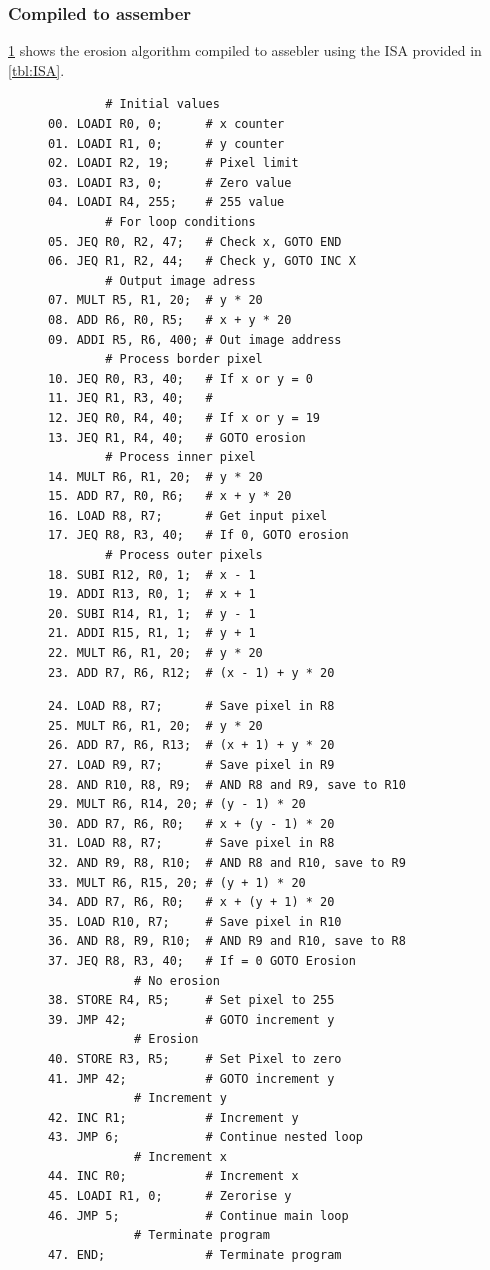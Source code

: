 \documentclass[a4paper, english]{article}
\numberwithin{equation}{section}
\begin{document}
\subsubsection{Compiled to assember}
\cref{lst:ass} shows the erosion algorithm compiled to assebler using the ISA provided in \cref{tbl:ISA}.
\begin{figure}
    \label{lst:ass}
    \begin{minipage}{0.49\textwidth}
        \vspace{1.5em}
        \centering
        \begin{verbatim}
        # Initial values
00. LOADI R0, 0;      # x counter
01. LOADI R1, 0;      # y counter
02. LOADI R2, 19;     # Pixel limit
03. LOADI R3, 0;      # Zero value
04. LOADI R4, 255;    # 255 value
        # For loop conditions
05. JEQ R0, R2, 47;   # Check x, GOTO END
06. JEQ R1, R2, 44;   # Check y, GOTO INC X
        # Output image adress
07. MULT R5, R1, 20;  # y * 20
08. ADD R6, R0, R5;   # x + y * 20
09. ADDI R5, R6, 400; # Out image address
        # Process border pixel
10. JEQ R0, R3, 40;   # If x or y = 0
11. JEQ R1, R3, 40;   #
12. JEQ R0, R4, 40;   # If x or y = 19
13. JEQ R1, R4, 40;   # GOTO erosion
        # Process inner pixel
14. MULT R6, R1, 20;  # y * 20
15. ADD R7, R0, R6;   # x + y * 20
16. LOAD R8, R7;      # Get input pixel
17. JEQ R8, R3, 40;   # If 0, GOTO erosion
        # Process outer pixels
18. SUBI R12, R0, 1;  # x - 1
19. ADDI R13, R0, 1;  # x + 1
20. SUBI R14, R1, 1;  # y - 1
21. ADDI R15, R1, 1;  # y + 1
22. MULT R6, R1, 20;  # y * 20
23. ADD R7, R6, R12;  # (x - 1) + y * 20
    \end{verbatim}
    \end{minipage}
    \begin{minipage}{0.49\textwidth}
        \vspace{.5em}
        \centering
        \begin{verbatim}
24. LOAD R8, R7;      # Save pixel in R8
25. MULT R6, R1, 20;  # y * 20
26. ADD R7, R6, R13;  # (x + 1) + y * 20
27. LOAD R9, R7;      # Save pixel in R9
28. AND R10, R8, R9;  # AND R8 and R9, save to R10
29. MULT R6, R14, 20; # (y - 1) * 20
30. ADD R7, R6, R0;   # x + (y - 1) * 20
31. LOAD R8, R7;      # Save pixel in R8
32. AND R9, R8, R10;  # AND R8 and R10, save to R9
33. MULT R6, R15, 20; # (y + 1) * 20
34. ADD R7, R6, R0;   # x + (y + 1) * 20
35. LOAD R10, R7;     # Save pixel in R10
36. AND R8, R9, R10;  # AND R9 and R10, save to R8
37. JEQ R8, R3, 40;   # If = 0 GOTO Erosion
            # No erosion
38. STORE R4, R5;     # Set pixel to 255
39. JMP 42;           # GOTO increment y
            # Erosion
40. STORE R3, R5;     # Set Pixel to zero
41. JMP 42;           # GOTO increment y
            # Increment y
42. INC R1;           # Increment y
43. JMP 6;            # Continue nested loop
            # Increment x
44. INC R0;           # Increment x
45. LOADI R1, 0;      # Zerorise y
46. JMP 5;            # Continue main loop
            # Terminate program
47. END;              # Terminate program
     \end{verbatim}
    \end{minipage}
\end{figure}
\end{document}
